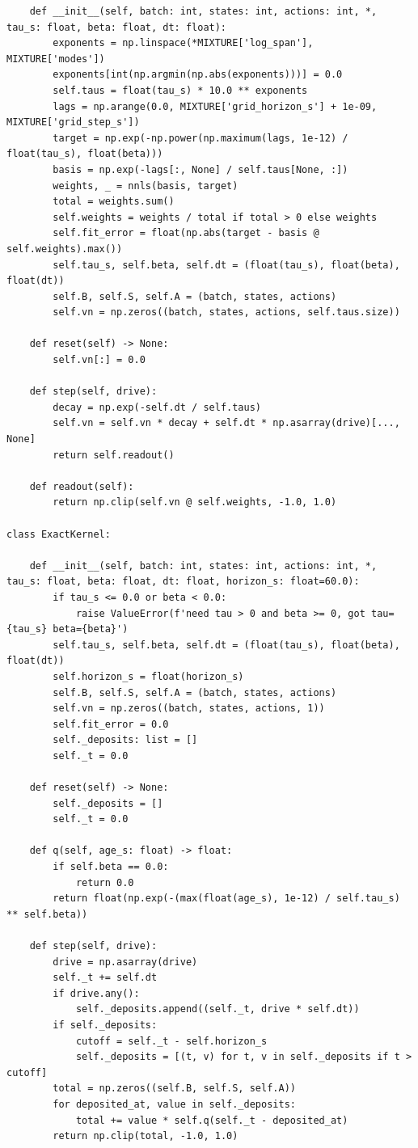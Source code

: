 \documentclass[a4paper,10pt]{article}
\begin{document}
\begin{Verbatim}
    def __init__(self, batch: int, states: int, actions: int, *, tau_s: float, beta: float, dt: float):
        exponents = np.linspace(*MIXTURE['log_span'], MIXTURE['modes'])
        exponents[int(np.argmin(np.abs(exponents)))] = 0.0
        self.taus = float(tau_s) * 10.0 ** exponents
        lags = np.arange(0.0, MIXTURE['grid_horizon_s'] + 1e-09, MIXTURE['grid_step_s'])
        target = np.exp(-np.power(np.maximum(lags, 1e-12) / float(tau_s), float(beta)))
        basis = np.exp(-lags[:, None] / self.taus[None, :])
        weights, _ = nnls(basis, target)
        total = weights.sum()
        self.weights = weights / total if total > 0 else weights
        self.fit_error = float(np.abs(target - basis @ self.weights).max())
        self.tau_s, self.beta, self.dt = (float(tau_s), float(beta), float(dt))
        self.B, self.S, self.A = (batch, states, actions)
        self.vn = np.zeros((batch, states, actions, self.taus.size))

    def reset(self) -> None:
        self.vn[:] = 0.0

    def step(self, drive):
        decay = np.exp(-self.dt / self.taus)
        self.vn = self.vn * decay + self.dt * np.asarray(drive)[..., None]
        return self.readout()

    def readout(self):
        return np.clip(self.vn @ self.weights, -1.0, 1.0)

class ExactKernel:

    def __init__(self, batch: int, states: int, actions: int, *, tau_s: float, beta: float, dt: float, horizon_s: float=60.0):
        if tau_s <= 0.0 or beta < 0.0:
            raise ValueError(f'need tau > 0 and beta >= 0, got tau={tau_s} beta={beta}')
        self.tau_s, self.beta, self.dt = (float(tau_s), float(beta), float(dt))
        self.horizon_s = float(horizon_s)
        self.B, self.S, self.A = (batch, states, actions)
        self.vn = np.zeros((batch, states, actions, 1))
        self.fit_error = 0.0
        self._deposits: list = []
        self._t = 0.0

    def reset(self) -> None:
        self._deposits = []
        self._t = 0.0

    def q(self, age_s: float) -> float:
        if self.beta == 0.0:
            return 0.0
        return float(np.exp(-(max(float(age_s), 1e-12) / self.tau_s) ** self.beta))

    def step(self, drive):
        drive = np.asarray(drive)
        self._t += self.dt
        if drive.any():
            self._deposits.append((self._t, drive * self.dt))
        if self._deposits:
            cutoff = self._t - self.horizon_s
            self._deposits = [(t, v) for t, v in self._deposits if t > cutoff]
        total = np.zeros((self.B, self.S, self.A))
        for deposited_at, value in self._deposits:
            total += value * self.q(self._t - deposited_at)
        return np.clip(total, -1.0, 1.0)


\end{Verbatim}
\end{document}
